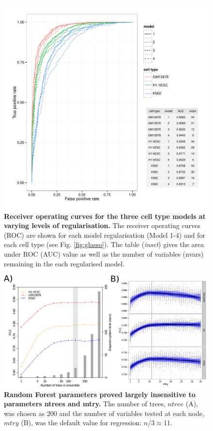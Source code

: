 \documentclass[a4paper]{report}
\begin{document}
\begin{figure}[H]
\begin{center}
\includegraphics[width=.75\textwidth]{figs/s4.pdf}
\captionsetup{width=.9\textwidth}
\caption{ {\bf Receiver operating curves for the three cell type
    models at varying levels of regularisation.}  
The receiver operating curves (ROC) are shown for each
  model regularisation (Model 1-4) and for each cell type (see
  Fig. \ref{fig:glasso}). The table (\emph{inset}) gives the
  area under ROC (AUC) value as well as the number of variables
  (nvars) remaining in the each regularised model.
}\label{fig:auroc}
\end{center} 
\end{figure} 

\begin{figure}[H]
\begin{center}
\includegraphics[width=.95\textwidth]{figs/s7_full.pdf}
\captionsetup{width=.9\textwidth}
\caption{ {\bf Random Forest parameters proved largely insensitive to
    parameters ntrees and mtry.}
The number of trees, $ntree$ (A),
was chosen as 200 and the number of variables tested at each
node, $mtry$ (B), was the default value for regression: $n/3 \approx 11$.
}\label{fig:rfparam}
\end{center} 
\end{figure} 
\end{document}
